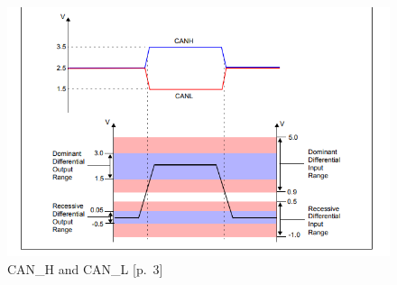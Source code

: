 \begin{figure}[h]
	\begin{center}
		\includegraphics[width=1\textwidth]{./images/can-high-low.jpg}
	\end{center}
	\vspace{-5pt}
	\caption[CAN_H and CAN_L]{CAN_H and CAN_L \cite{Richards2002}[p.~3]} %
	\label{fig:can-h:can-l}
	\vspace{-5pt}
\end{figure}